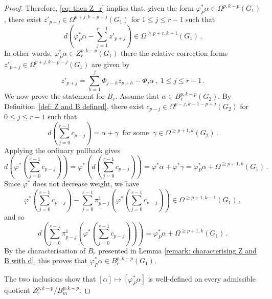\documentclass[dvipsnames]{amsart}
\theoremstyle{definition}
\theoremstyle{definition}
\numberwithin{equation}{section}
\begin{document}
\begin{proof}
Therefore, \eqref{eq: then Z_r} implies that, given the form $\varphi_P^\ast\alpha\in\Omega^{p,k-p}(G_1)$, there exist $z'_{p+j}\in\Omega^{p+j,k-p-j}(G_1)$ for $1\le j\le r-1$ such that
\[
d
\left(
\varphi_P^*\alpha
-
\sum_{j=1}^{r-1}z'_{p+j}
\right)
\in
\Omega^{\geq p+r,k+1}(G_1)\,.
\]
In other words, $\varphi_P^*\alpha\in Z_r^{p,k-p}(G_1)$ there the relative correction forms $z'_{p+j}\in\Omega^{p+j,k-p-j}(G_1)$ are given by
$$
z'_{p+j}
=
\sum_{h=1}^{j}\Phi_{j-h}z_{p+h}
-
\Phi_j\alpha\ ,
\
1\leq j\leq r-1\,.$$
We now prove the statement for \(B_r\). Assume that $\alpha\in B_r^{p,k-p}(G_2)$.
By Definition~\ref{def: Z and B defined}, there exist $c_{p-j}
\in
\Omega^{p-j,k-1-p+j}(G_2)$ for $0\leq j\leq r-1$
such that
$$d\left(\sum_{j=0}^{r-1}c_{p-j}\right)
=
\alpha+\gamma\ \text{ for some }
\
\gamma\in\Omega^{\geq p+1,k}(G_2)\,.$$
Applying the ordinary pullback gives
\[
d\left(\varphi^*\left(\sum_{j=0}^{r-1}c_{p-j}\right)\right)
=
\varphi^*\left(d\left(\sum_{j=0}^{r-1}c_{p-j}\right)\right)
=
\varphi^*\alpha+\varphi^*\gamma
=
\varphi_P^*\alpha
+
\Omega^{\geq p+1,k}(G_1)\,.
\]
Since \(\varphi^*\) does not decrease weight, we have
\[
\varphi^*\left(\sum_{j=0}^{r-1}c_{p-j}\right)-\sum_{j=0}^{r-1}
\pi_{p-j}^1\left(\varphi^*\left(\sum_{j=0}^{r-1}c_{p-j}\right)\right)
\in
\Omega^{\geq p+1,k-1}(G_1)\,,
\]
and so
\[
d \left( \sum_{j=0}^{r-1}
\pi_{p-j}^1\left(\varphi^*\left(\sum_{j=0}^{r-1}c_{p-j}\right)\right)\right)
=
\varphi_P^*\alpha
+
\Omega^{\geq p+1,k}(G_1)\,.
\]
By the characterisation of $B_r$ presented in Lemma \ref{remark: characterising Z and B with d}, this proves that $\varphi_P^*\alpha\in B_r^{p,k-p}(G_1)$.

The two inclusions show that $[\alpha]\longmapsto[\varphi_P^*\alpha]$
is well-defined on every admissible quotient
\(Z_r^{p,k-p}/B_m^{p,k-p}\).
\end{proof}
\end{document}
